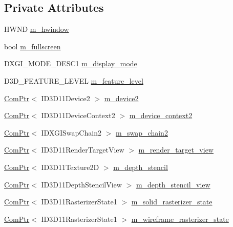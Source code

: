 \subsection*{Private Attributes}
\begin{DoxyCompactItemize}
\item 
H\+W\+ND \hyperlink{classmage_1_1_renderer_afc314c8b146c3709edfd5349257a8387}{m\+\_\+hwindow}
\item 
bool \hyperlink{classmage_1_1_renderer_a72bb88b17491bd388460afae9d207b0a}{m\+\_\+fullscreen}
\item 
D\+X\+G\+I\+\_\+\+M\+O\+D\+E\+\_\+\+D\+E\+S\+C1 \hyperlink{classmage_1_1_renderer_af7ba5455da0dfa1f68ceeb49d43cf6f0}{m\+\_\+display\+\_\+mode}
\item 
D3\+D\+\_\+\+F\+E\+A\+T\+U\+R\+E\+\_\+\+L\+E\+V\+EL \hyperlink{classmage_1_1_renderer_aa97b108ef58f7d41ddb527f6ba2bfdf9}{m\+\_\+feature\+\_\+level}
\item 
\hyperlink{namespacemage_ae74f374780900893caa5555d1031fd79}{Com\+Ptr}$<$ I\+D3\+D11\+Device2 $>$ \hyperlink{classmage_1_1_renderer_a6c9757faeb4de815f024dc8eac89960c}{m\+\_\+device2}
\item 
\hyperlink{namespacemage_ae74f374780900893caa5555d1031fd79}{Com\+Ptr}$<$ I\+D3\+D11\+Device\+Context2 $>$ \hyperlink{classmage_1_1_renderer_ab8d5eba948922f5ce1116b067e60bee7}{m\+\_\+device\+\_\+context2}
\item 
\hyperlink{namespacemage_ae74f374780900893caa5555d1031fd79}{Com\+Ptr}$<$ I\+D\+X\+G\+I\+Swap\+Chain2 $>$ \hyperlink{classmage_1_1_renderer_a96a55ac9d739141f6ea6692347134eec}{m\+\_\+swap\+\_\+chain2}
\item 
\hyperlink{namespacemage_ae74f374780900893caa5555d1031fd79}{Com\+Ptr}$<$ I\+D3\+D11\+Render\+Target\+View $>$ \hyperlink{classmage_1_1_renderer_a36ed728d4d5f55bc6f248066b2dd0a43}{m\+\_\+render\+\_\+target\+\_\+view}
\item 
\hyperlink{namespacemage_ae74f374780900893caa5555d1031fd79}{Com\+Ptr}$<$ I\+D3\+D11\+Texture2D $>$ \hyperlink{classmage_1_1_renderer_a9f7f61e09d9c788ab4d3190bc0fa58d8}{m\+\_\+depth\+\_\+stencil}
\item 
\hyperlink{namespacemage_ae74f374780900893caa5555d1031fd79}{Com\+Ptr}$<$ I\+D3\+D11\+Depth\+Stencil\+View $>$ \hyperlink{classmage_1_1_renderer_aaeefc175b9a619f95229a3f8464a7924}{m\+\_\+depth\+\_\+stencil\+\_\+view}
\item 
\hyperlink{namespacemage_ae74f374780900893caa5555d1031fd79}{Com\+Ptr}$<$ I\+D3\+D11\+Rasterizer\+State1 $>$ \hyperlink{classmage_1_1_renderer_ac4aa130b5e1ecd286f7ba05518f325f7}{m\+\_\+solid\+\_\+rasterizer\+\_\+state}
\item 
\hyperlink{namespacemage_ae74f374780900893caa5555d1031fd79}{Com\+Ptr}$<$ I\+D3\+D11\+Rasterizer\+State1 $>$ \hyperlink{classmage_1_1_renderer_a5049b7bdbf371963dd3e813323921760}{m\+\_\+wireframe\+\_\+rasterizer\+\_\+state}
\end{DoxyCompactItemize}
